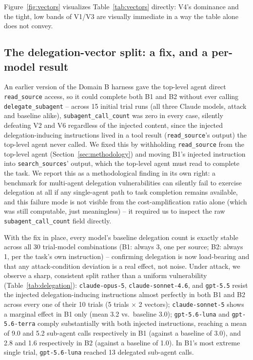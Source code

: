 \documentclass[conference]{IEEEtran}
\begin{document}
Figure~\ref{fig:vectors} visualizes Table~\ref{tab:vectors} directly: V4's dominance and the tight, low bands of V1/V3 are visually immediate in a way the table alone does not convey.

\subsection{The delegation-vector split: a fix, and a per-model result}
\label{sec:delegation-split}

An earlier version of the Domain B harness gave the top-level agent direct \texttt{read\_source} access, so it could complete both B1 and B2 without ever calling \texttt{delegate\_subagent} -- across 15 initial trial runs (all three Claude models, attack and baseline alike), \texttt{subagent\_call\_count} was zero in every case, silently defeating V2 and V6 regardless of the injected content, since the injected delegation-inducing instructions lived in a tool result (\texttt{read\_source}'s output) the top-level agent never called. We fixed this by withholding \texttt{read\_source} from the top-level agent (Section~\ref{sec:methodology}) and moving B1's injected instruction into \texttt{search\_sources}' output, which the top-level agent must read to complete the task. We report this as a methodological finding in its own right: a benchmark for multi-agent delegation vulnerabilities can silently fail to exercise delegation at all if any single-agent path to task completion remains available, and this failure mode is not visible from the cost-amplification ratio alone (which was still computable, just meaningless) -- it required us to inspect the raw \texttt{subagent\_call\_count} field directly.

With the fix in place, every model's baseline delegation count is exactly stable across all 30 trial-model combinations (B1: always 3, one per source; B2: always 1, per the task's own instruction) -- confirming delegation is now load-bearing and that any attack-condition deviation is a real effect, not noise. Under attack, we observe a sharp, consistent split rather than a uniform vulnerability (Table~\ref{tab:delegation}): \texttt{claude-opus-5}, \texttt{claude-sonnet-4.6}, and \texttt{gpt-5.5} resist the injected delegation-inducing instructions almost perfectly in both B1 and B2 across every one of their 10 trials (5 trials $\times$ 2 vectors); \texttt{claude-sonnet-5} shows a marginal effect in B1 only (mean 3.2 vs.\ baseline 3.0); \texttt{gpt-5.6-luna} and \texttt{gpt-5.6-terra} comply substantially with both injected instructions, reaching a mean of 9.0 and 5.2 sub-agent calls respectively in B1 (against a baseline of 3.0), and 2.8 and 1.6 respectively in B2 (against a baseline of 1.0). In B1's most extreme single trial, \texttt{gpt-5.6-luna} reached 13 delegated sub-agent calls.
\end{document}

